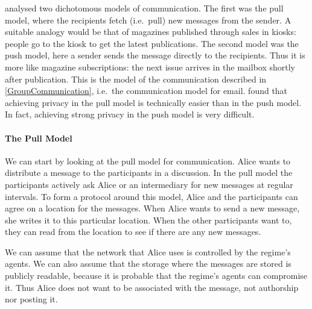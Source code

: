 \citet{PPACinPubFS} analysed two dichotomous models of communication.
The first was the pull model, where the recipients fetch (i.e.\ pull) new 
messages from the sender.
A suitable analogy would be that of magazines published through sales in 
kiosks: people go to the kiosk to get the latest publications.
The second model was the push model, here a sender sends the message directly 
to the recipients.
Thus it is more like magazine subscriptions: the next issue arrives in the 
mailbox shortly after publication.
This is the model of the communication described in \cref{GroupCommunication}, 
i.e.\ the communication model for email.
\citeauthor{PPACinPubFS} found that achieving privacy in the pull model is 
technically easier than in the push model.
In fact, achieving strong privacy in the push model is very
difficult. %

\paragraph{The Pull Model}

We can start by looking at the pull model for communication.
Alice wants to distribute a message to the participants in a discussion.
In the pull model the participants actively ask Alice or an intermediary for 
new messages at regular intervals.
To form a protocol around this model, Alice and the participants can agree on 
a location for the messages.
When Alice wants to send a new message, she writes it to this particular 
location.
When the other participants want to, they can read from the location to see if 
there are any new messages.

We can assume that the network that Alice uses is controlled by the regime's 
agents.
We can also assume that the storage where the messages are stored is publicly 
readable, because it is probable that the regime's agents can compromise it.
Thus Alice does not want to be associated with the message, not authorship nor 
posting it.

